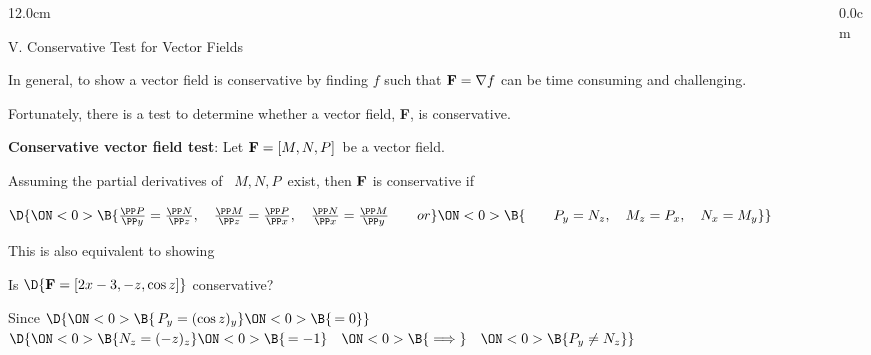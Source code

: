 \begin{frame}
\begin{columns}\begin{column}{12.0cm}

{V. Conservative Test for Vector Fields}

\vspace{0.3cm}

\scriptsize

In general, to show a vector field is conservative by finding $f$ such that ${\bf F} = \nabla f$ can be time consuming and challenging.

\vspace{0.5cm}

Fortunately, there is a test to determine whether a vector field, {\bf F}, is conservative.

\vspace{0.5cm}

{\bf Conservative vector field test}: \quad  Let ${\bf F} = [M,N,P]$\, be a vector field.  

\vspace{0.5cm}

Assuming the partial derivatives of \, $M, N, P$\,  exist, then ${\bf F}$ is conservative if 

\begin{center}
	$\D{
	\ON<0>{\B{
	\frac{\PP P}{\PP y} = \frac{\PP N}{\PP z}, \quad 
	\frac{\PP M}{\PP z} = \frac{\PP P}{\PP x}, \quad 
	\frac{\PP N}{\PP x} = \frac{\PP M}{\PP y} \qquad 
	or }}
	\ON<0>{\B{\qquad P_y = N_z, \quad M_z=P_x, \quad N_x=M_y}}}$
\end{center}

This is also equivalent to showing

\begin{center}
	 \quad 
	\ON<0>{\B{or \quad $\nabla \times {\bf F} = {\bf 0}$}}
\end{center}

\EX Is $\D{{\bf F} = [2x-3,-z,\cos z]}$ conservative?

\vspace{0.2cm}
Since $\D{
\ON<0>{\B{\, P_y = (\cos z)_y}}
\ON<0>{\B{\,= 0}}
}$ \quad 
{} \quad 
$\D{
\ON<0>{\B{N_z = (-z)_z}}
\ON<0>{\B{\, = -1}} \quad 
\ON<0>{\B{\implies}} \quad 
\ON<0>{\B{P_y \ne N_z}}}$

\vspace{0.2cm}


\vspace{1.2cm}

\end{column}\begin{column}{0.0cm}\end{column}\end{columns}
\end{frame}
